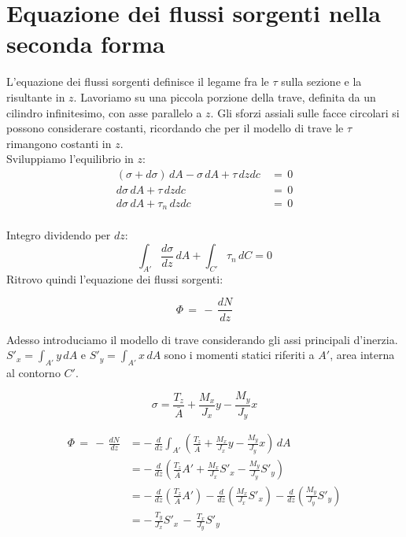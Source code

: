 \section{Equazione dei flussi sorgenti nella seconda forma}

L'equazione dei flussi sorgenti definisce il legame fra le $\tau$ sulla sezione e la risultante in $z$.
Lavoriamo su una piccola porzione della trave, definita da un cilindro infinitesimo, con asse parallelo a $z$. Gli sforzi assiali sulle facce circolari si possono considerare costanti, ricordando che per il modello di trave le $\tau $ rimangono costanti in $z$.\\

Sviluppiamo l'equilibrio in $z$:
\begin{align*}
    (\sigma + d\sigma)\,dA - \sigma \,dA+\tau\, dzdc \,&=\,0\\
    d\sigma \,dA +\tau\, dzdc \,&=\,0\\
    d\sigma \,dA +\tau_n\, dzdc \,&=\,0\\
\end{align*}

Integro dividendo per $dz$:
\begin{equation*}
    \int_{A'} \frac{d\sigma}{dz} \,dA+  \int_{C'} \tau_n \,dC = 0
\end{equation*}
 Ritrovo quindi l'equazione dei flussi sorgenti:

  \begin{equation*}
    \Phi \,=\,  - \,\frac{dN}{dz}
\end{equation*}

Adesso introduciamo il modello di trave considerando  gli assi principali d'inerzia. $S'_x = \int_{A'}y \,dA$ e $S'_y = \int_{A'}x \,dA$ sono i momenti statici riferiti a $A'$, area interna al contorno $C'$.

 \begin{equation*}
        \sigma = \frac{T_z}{\bar{A}} +  \frac{M_x}{J_x}y -\frac{M_y}{J_y}x
    \end{equation*}

    \begin{align*}
    \Phi \,=\,  - \,\frac{dN}{dz} &= - \,\frac{d}{dz} \int_{A'}    \left(\frac{T_z}{\bar{A}} +  \frac{M_x}{J_x}y -\frac{M_y}{J_y}x \right) \,dA\\
    &= - \,\frac{d}{dz} \left(\frac{T_z}{\bar{A}} A'+  \frac{M_x}{J_x}S'_x -\frac{M_y}{J_y}S'_y \right)\\
    &= - \,\frac{d}{dz} \left(\frac{T_z}{\bar{A}} A'\right)-  \frac{d}{dz} \left(\frac{M_x}{J_x}S'_x \right)-\frac{d}{dz} \left(\frac{M_y}{J_y}S'_y \right)\\
    &= -\, \frac{T_y}{J_x}S'_x  \,-\, \frac{T_x}{J_y}S'_y 
\end{align*}

